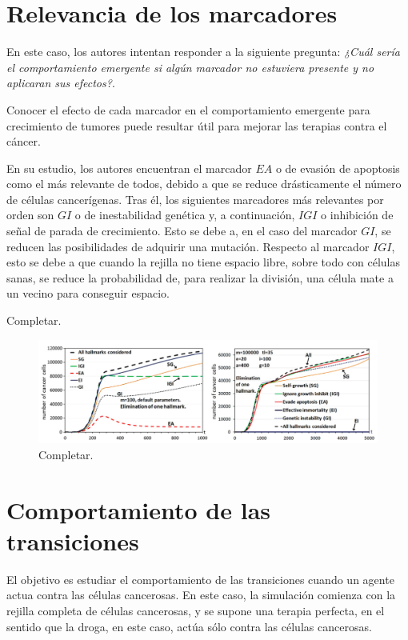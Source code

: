 \section{Relevancia de los marcadores}

En este caso, los autores intentan responder a la siguiente pregunta: \textit{¿Cuál sería
el comportamiento emergente si algún marcador no estuviera presente y no aplicaran
sus efectos?}.

Conocer el efecto de cada marcador en el comportamiento emergente para crecimiento de tumores
puede resultar útil para mejorar las terapias contra el cáncer.

En su estudio, los autores encuentran el marcador $EA$ o de evasión de apoptosis como el más
relevante de todos, debido a que se reduce drásticamente el número de células cancerígenas.
Tras él, los siguientes marcadores más relevantes por orden son $GI$ o de inestabilidad genética y,
a continuación, $IGI$ o inhibición de señal de parada de crecimiento. Esto se debe a, en el caso
del marcador $GI$, se reducen las posibilidades de adquirir una mutación. Respecto al marcador $IGI$,
esto se debe a que cuando la rejilla no tiene espacio libre, sobre todo con células sanas, se reduce
la probabilidad de, para realizar la división, una célula mate a un vecino para conseguir espacio.

Completar.

\begin{figure}[h]
\centering
\includegraphics[scale=0.5]{figures/experiments/exp6}
\caption{Completar.}
\end{figure}

\section{Comportamiento de las transiciones}

El objetivo es estudiar el comportamiento de las transiciones cuando un agente actua contra las células cancerosas.
En este caso, la simulación comienza con la rejilla completa de células cancerosas, y se supone una terapia
perfecta, en el sentido que la droga, en este caso, actúa sólo contra las células cancerosas.

